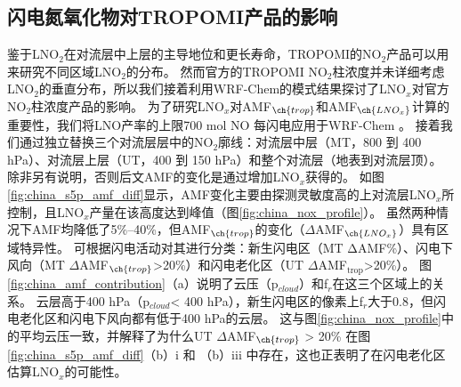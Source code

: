 \subsection{闪电氮氧化物对TROPOMI产品的影响}  \label{sec:lnox_affects_tropomi}

鉴于LNO$_2$在对流层中上层的主导地位和更长寿命，TROPOMI的NO$_2$产品可以用来研究不同区域LNO$_2$的分布。
然而官方的TROPOMI NO$_2$柱浓度并未详细考虑LNO$_2$的垂直分布，所以我们接着利用WRF-Chem的模式结果探讨了LNO$_x$对官方NO$_2$柱浓度产品的影响。
为了研究LNO$_x$对AMF$_{\ch{trop}}$和AMF$_{\ch{LNO_x}}$计算的重要性，我们将LNO产率的上限700 mol NO 每闪电\citep{Ott.2010}应用于WRF-Chem 。
接着我们通过独立替换三个对流层层中的NO$_2$廓线：对流层中层（MT，800 到 400 hPa）、对流层上层（UT，400 到 150 hPa）和整个对流层（地表到对流层顶）。
除非另有说明，否则后文AMF的变化是通过增加LNO$_x$获得的。
如图\ref{fig:china_s5p_amf_diff}显示，AMF变化主要由探测灵敏度高的上对流层LNO$_x$所控制\citep{Beirle.2009,Laughner.2017}，且LNO$_x$产量在该高度达到峰值（图\ref{fig:china_nox_profile}）。
虽然两种情况下AMF均降低了5\%--40\%，但AMF$_{\ch{trop}}$的变化（$\Delta$AMF$_{\ch{LNO_x}}$）具有区域特异性。
可根据闪电活动对其进行分类：新生闪电区（MT ΔAMF\%）、闪电下风向（MT $\Delta$AMF$_{\ch{trop}}$>20\%）和闪电老化区（UT $\Delta$AMF$_\textrm{trop}$>20\%）。
图\ref{fig:china_amf_contribution}（a）说明了云压（p$_{cloud}$）和f$_r$在这三个区域上的关系。
云层高于400 hPa（p$_{cloud}$< 400 hPa），新生闪电区的像素上f$_r$大于0.8，但闪电老化区和闪电下风向都有低于400 hPa的云层。
这与图\ref{fig:china_nox_profile}中的平均云压一致，并解释了为什么UT $\Delta$AMF$_{\ch{trop}}$ > 20\% 在图\ref{fig:china_s5p_amf_diff}（b）i 和 （b）iii 中存在，这也正表明了在闪电老化区估算LNO$_x$的可能性。


